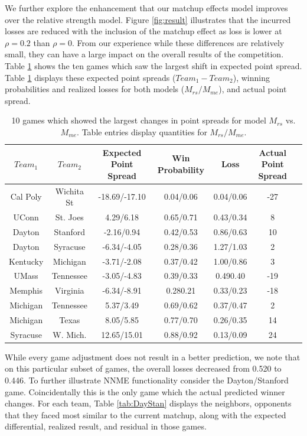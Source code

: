 \documentclass[letterpaper,12pt]{article}
\begin{document}
We further explore the enhancement that our matchup effects model improves over the relative strength model.  Figure \ref{fig:result} illustrates that the incurred losses are reduced with the inclusion of the matchup effect as loss is lower at $\rho=0.2$ than $\rho=0$. From our experience while these differences are relatively small, they can have a large impact on the overall results of the competition. Table \ref{tab:change} shows the ten games which saw the largest shift in expected point spread. Table \ref{tab:change} displays these expected point spreads ($Team_1 - Team_2$), winning probabilities and realized losses for both models ($M_{rs}/M_{me}$), and actual point spread. 
\begin{table}[h!]
\caption{10 games which showed the largest changes in point spreads for model $M_{rs}$ vs. $M_{me}$. Table entries display quantities for $M_{rs}/M_{me}$.\label{tab:change}}
\scriptsize
\centering
\begin{tabular}{|cc | ccc |c|c|}
  \hline
  \hline
 $Team_1$ & $Team_2$ & Expected Point Spread & Win Probability & Loss & Actual Point Spread\\ 
  \hline
 Cal Poly & Wichita St & -18.69/-17.10  & 0.04/0.06 & 0.04/0.06&  -27\\ 
 UConn & St. Joes &4.29/6.18 & 0.65/0.71 & 0.43/0.34  & 8\\ 
 Dayton & Stanford & -2.16/0.94 & 0.42/0.53 & 0.86/0.63& 10 \\ 
 Dayton & Syracuse & -6.34/-4.05 & 0.28/0.36 & 1.27/1.03& 2\\ 
 Kentucky & Michigan & -3.71/-2.08 & 0.37/0.42 & 1.00/0.86 & 3\\ 
 UMass & Tennessee &-3.05/-4.83 & 0.39/0.33 & 0.490.40 & -19\\ 
 Memphis & Virginia & -6.34/-8.91 & 0.280.21 & 0.33/0.23 & -18\\ 
 Michigan & Tennessee & 5.37/3.49 & 0.69/0.62 & 0.37/0.47 & 2\\ 
 Michigan & Texas & 8.05/5.85 & 0.77/0.70 & 0.26/0.35 & 14\\ 
 Syracuse & W. Mich. & 12.65/15.01 & 0.88/0.92 & 0.13/0.09& 24\\ 
   \hline
   \hline
\end{tabular}
\end{table}
While every game adjustment does not result in a better prediction,  we note that on this particular subset of games, the overall losses decreased from 0.520 to 0.446. To further illustrate NNME functionality consider the Dayton/Stanford game.  Coincidentally this is the only game which the actual predicted winner changes. For each team, Table \ref{tab:DayStan} displays the neighbors, opponents that they faced most similar to the current matchup, along with the expected differential, realized result, and residual in those games. 
\end{document}
